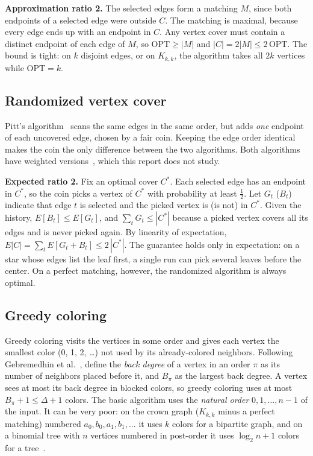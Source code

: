 \documentclass[acmsmall,nonacm]{acmart}
\newcommand{\OPT}{\mathrm{OPT}}
\begin{document}
\textbf{Approximation ratio 2.} The selected edges form a matching $M$, since
both endpoints of a selected edge were outside $C$. The matching is maximal,
because every edge ends up with an endpoint in $C$. Any vertex cover must
contain a distinct endpoint of each edge of $M$, so $\OPT\ge|M|$ and
$|C|=2|M|\le 2\,\OPT$. The bound is tight: on $k$ disjoint edges, or on
$K_{k,k}$, the algorithm takes all $2k$ vertices while $\OPT=k$.

\subsection{Randomized vertex cover}

Pitt's algorithm~\cite{pitt1985} scans the same edges in the same order, but
adds \emph{one} endpoint of each uncovered edge, chosen by a fair coin. Keeping
the edge order identical makes the coin the only difference between the two
algorithms. Both algorithms have weighted versions~\cite{pitt1985,baryehuda1981},
which this report does not study.

\textbf{Expected ratio 2.} Fix an optimal cover $C^*$. Each selected edge has
an endpoint in $C^*$, so the coin picks a vertex of $C^*$ with probability at
least $\frac12$. Let $G_t$ ($B_t$) indicate that edge $t$ is selected and the
picked vertex is (is not) in $C^*$. Given the history, $E[B_t]\le E[G_t]$, and
$\sum_t G_t\le|C^*|$ because a picked vertex covers all its edges and is never
picked again. By linearity of expectation, $E|C|=\sum_t E[G_t+B_t]\le
2\,|C^*|$. The guarantee holds only in expectation: on a star whose edges list
the leaf first, a single run can pick several leaves before the center. On a
perfect matching, however, the randomized algorithm is always optimal.

\subsection{Greedy coloring}

Greedy coloring visits the vertices in some order and gives each vertex the
smallest color (0, 1, 2, \ldots) not used by its already-colored neighbors.
Following Gebremedhin et al.~\cite{gebremedhin2009}, define the \emph{back
degree} of a vertex in an order $\pi$ as its number of neighbors placed before
it, and $B_\pi$ as the largest back degree. A vertex sees at most its back
degree in blocked colors, so greedy coloring uses at most $B_\pi+1\le\Delta+1$
colors. The basic algorithm uses the \emph{natural order} $0,1,\ldots,n-1$ of
the input. It can be very poor: on the crown graph ($K_{k,k}$ minus a perfect
matching) numbered $a_0,b_0,a_1,b_1,\ldots$ it uses $k$ colors for a bipartite
graph, and on a binomial tree with $n$ vertices numbered in post-order it uses
$\log_2 n+1$ colors for a tree~\cite{gyarfas1988}.
\end{document}
